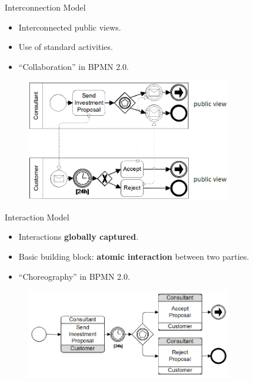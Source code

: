 \documentclass[xcolor=svgnames]{beamer}
\begin{document}
  \begin{frame}{Interconnection Model}
      \begin{itemize}
	\item Interconnected public views.	
	\item Use of standard activities.
 	\item ``Collaboration'' in BPMN 2.0.
      \end{itemize}
   \begin{figure}[!h]
	    \centering
	    \includegraphics[width=0.8\textwidth]{interconnection_choreography.png}
    \end{figure}	 
  \end{frame}


  \begin{frame}{Interaction Model}
    \begin{itemize}
	  \item Interactions \textbf{globally captured}.	
	  \item Basic building block: \textbf{atomic interaction} between two parties.
	  \item ``Choreography'' in BPMN 2.0.
	\end{itemize}
    \begin{figure}[!h]
	      \centering
	      \includegraphics[width=0.8\textwidth]{interaction_choreography.png}
      \end{figure}	 
  \end{frame}
\end{document}
